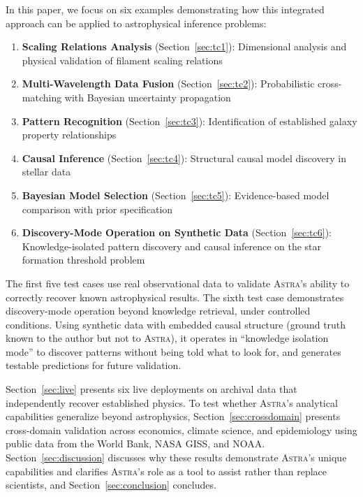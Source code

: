 \documentclass[usenatbib]{rasti}
\newcommand{\astra}{\textsc{Astra}\xspace}
\begin{document}
In this paper, we focus on six examples demonstrating how this integrated approach can be applied to astrophysical inference problems:
\begin{enumerate}
  \item[(i)] \textbf{Scaling Relations Analysis} (Section~\ref{sec:tc1}): Dimensional analysis and physical validation of filament scaling relations
  \item[(ii)] \textbf{Multi-Wavelength Data Fusion} (Section~\ref{sec:tc2}): Probabilistic cross-matching with Bayesian uncertainty propagation
  \item[(iii)] \textbf{Pattern Recognition} (Section~\ref{sec:tc3}): Identification of established galaxy property relationships
  \item[(iv)] \textbf{Causal Inference} (Section~\ref{sec:tc4}): Structural causal model discovery in stellar data
  \item[(v)] \textbf{Bayesian Model Selection} (Section~\ref{sec:tc5}): Evidence-based model comparison with prior specification
  \item[(vi)] \textbf{Discovery-Mode Operation on Synthetic Data} (Section~\ref{sec:tc6}): Knowledge-isolated pattern discovery and causal inference on the star formation threshold problem
\end{enumerate}

The first five test cases use real observational data to validate \astra's ability to correctly recover known astrophysical results.
The sixth test case demonstrates discovery-mode operation beyond knowledge retrieval, under controlled conditions.
Using synthetic data with embedded causal structure (ground truth known to the author but not to \astra), it operates in ``knowledge isolation mode'' to discover patterns without being told what to look for, and generates testable predictions for future validation.

Section~\ref{sec:live} presents six live deployments on archival data that independently recover established physics.
To test whether \astra's analytical capabilities generalize beyond astrophysics, Section~\ref{sec:crossdomain} presents cross-domain validation across economics, climate science, and epidemiology using public data from the World Bank, NASA GISS, and NOAA.
Section~\ref{sec:discussion} discusses why these results demonstrate \astra's unique capabilities and clarifies \astra's role as a tool to assist rather than replace scientists, and Section~\ref{sec:conclusion} concludes.

\end{document}
